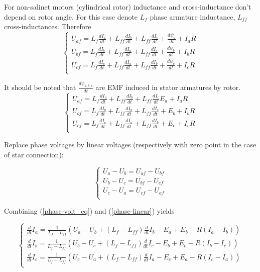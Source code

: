 \documentclass[11pt,a4paper,oneside]{report}
\begin{document}
For non-salinet motors (cylindrical rotor) inductance and cross-inductance don't depend on rotor angle. For this case denote $L_f$ phase armature inductance, $L_{ff}$ cross-inductances. Therefore
\begin{equation}
\left\{
\begin{split}
	U_{af} = L_f\frac{dI_a}{dt}+L_{ff}\frac{dI_b}{dt}+L_{ff}\frac{dI_c}{dt}+\frac{d\psi_a}{dt}+I_aR\\
	U_{bf} = L_f\frac{dI_b}{dt}+L_{ff}\frac{dI_a}{dt}+L_{ff}\frac{dI_c}{dt}+\frac{d\psi_b}{dt}+I_bR\\
	U_{cf} = L_f\frac{dI_c}{dt}+L_{ff}\frac{dI_a}{dt}+L_{ff}\frac{dI_b}{dt}+\frac{d\psi_c}{dt}+I_cR\\
\end{split}
\right.
\end{equation}

It should be noted that $\frac{d\psi_{a,b,c}}{dt}$ are EMF induced in stator armatures by rotor.
\begin{equation}
	\label{phase-volt_eq}
	\left\{
\begin{split}
	U_{af} = L_f\frac{dI_a}{dt}+L_{ff}\frac{dI_b}{dt}+L_{ff}\frac{dI_c}{dt}E_a+I_aR\\
	U_{bf} = L_f\frac{dI_b}{dt}+L_{ff}\frac{dI_a}{dt}+L_{ff}\frac{dI_c}{dt}+E_b+I_bR\\
	U_{cf} = L_f\frac{dI_c}{dt}+L_{ff}\frac{dI_a}{dt}+L_{ff}\frac{dI_b}{dt}+E_c+I_cR\\
\end{split}
\right.
\end{equation}

Replace phase voltages by linear voltages (respectively with zero point in the case of star connection):

\begin{equation}
	\label{phase-linear}
	\left\{
	\begin{split}
		U_a-U_b=U_{af}-U_{bf}\\
		U_b-U_c=U_{bf}-U_{cf}\\
		U_c-U_a=U_{cf}-U_{af}\\
	\end{split}
	\right.
\end{equation}

Combining (\ref{phase-volt_eq}) and (\ref{phase-linear}) yields

\begin{equation}
	\label{phase-linear}
	\left\{
	\begin{split}
		\frac{d}{dt}I_a=\frac{1}{L_f-L_{ff}}\left(U_a-U_b+(L_f-L_{ff})\frac{d}{dt}I_b-E_a+E_b-R(I_a-I_b) \right)\\
		\frac{d}{dt}I_b=\frac{1}{L_f-L_{ff}}\left(U_b-U_c+(L_f-L_{ff})\frac{d}{dt}I_c-E_b+E_c-R(I_b-I_c) \right)\\
		\frac{d}{dt}I_c=\frac{1}{L_f-L_{ff}}\left(U_c-U_a+(L_f-L_{ff})\frac{d}{dt}I_a-E_c+E_a-R(I_c-I_a) \right)\\
	\end{split}
	\right.
\end{equation}
\end{document}
